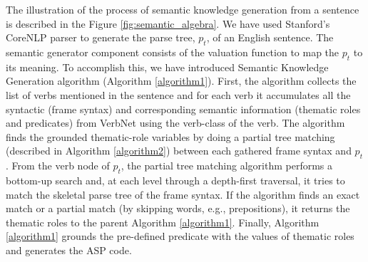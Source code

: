 \documentclass[letterpaper]{article}
\begin{document}
The illustration of the process of semantic knowledge generation from a sentence is described in the Figure \ref{fig:semantic_algebra}. We have used Stanford's CoreNLP parser \cite{corenlp} to generate the parse tree, $p_t$, of an English sentence. The semantic generator component consists of the valuation function to map the $p_t$ to its meaning. To accomplish this, we have introduced Semantic Knowledge Generation algorithm (Algorithm \ref{algorithm1}). First, the algorithm collects the list of verbs mentioned in the sentence and for each verb it accumulates all the syntactic (frame syntax) and corresponding semantic information (thematic roles and predicates)  from VerbNet using the verb-class of the verb. The algorithm finds the grounded thematic-role variables by doing a partial tree matching (described in Algorithm \ref{algorithm2}) between each gathered frame syntax and $p_t$. From the verb node of $p_t$, the partial tree matching algorithm performs a bottom-up search and, at each level through a depth-first traversal, it tries to match the skeletal parse tree of the frame syntax. If the algorithm finds an exact match or a partial match (by skipping words, e.g., prepositions), it returns the thematic roles to the parent Algorithm \ref{algorithm1}. Finally, Algorithm \ref{algorithm1} grounds the pre-defined predicate with the values of thematic roles and generates the ASP code.
\end{document}
